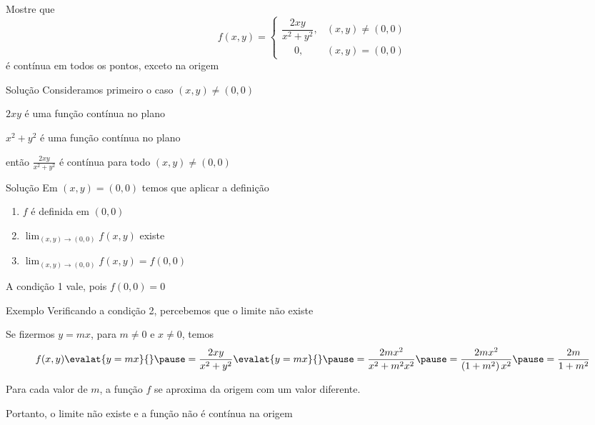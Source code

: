\documentclass[fleqn,utf8,aspectratio=169,12pt,ignorenonframetext]{beamer}
\begin{document}
\begin{question}
  Mostre que
  \[
    f(x, y) =
    \begin{cases}
      \dfrac{2xy}{x^2+y^2}, & (x, y) \neq (0, 0) \\
      \quad\; 0,            & (x, y) =    (0, 0)
    \end{cases}
  \]
  é contínua em todos os pontos, exceto na origem
\end{question}

\begin{resolution}{Solução}
  Consideramos primeiro o caso \((x, y) \neq (0, 0)\)

  \pause
  \vspace{\baselineskip}
  \(2xy\) é uma função contínua no plano

  \pause
  \(x^2+y^2\) é uma função contínua no plano

  \pause
  então \(\frac{2xy}{x^2+y^2}\)
  \pause
  é contínua para todo \((x, y) \neq (0, 0)\)
\end{resolution}

\begin{resolution}{Solução}
  Em \((x, y) = (0, 0)\) temos que aplicar a definição

  \pause
  \vspace{0.5\baselineskip}
  \begin{enumerate}
    \setlength\itemsep{1.5em}
    \item \(f\) é definida em \((0, 0)\)
    \item \(\lim_{(x, y)\to(0, 0)} f(x, y)\) existe
    \item \(\lim_{(x, y)\to(0, 0)} f(x, y) = f(0, 0)\)
  \end{enumerate}

  \pause
  \vspace{\baselineskip}
  A condição 1 vale, pois \(f(0, 0) = 0\)
\end{resolution}

\begin{frame}{Exemplo \theexemplo}
  Verificando a condição 2, percebemos que o limite não existe

  \pause
  Se fizermos \(y=mx\),
  \pause
  para \(m\neq 0\) e \(x\neq 0\), temos
  \pause
  \[
    f(x, y)\evalat{y=mx}{}
    \pause
    = \frac{2xy}{x^2+y^2}\evalat{y=mx}{}
    \pause
    = \frac{2mx^2}{x^2+m^2x^2}
    \pause
    = \frac{2mx^2}{\left(1+m^2\right)x^2}
    \pause
    = \frac{2m}{1+m^2}
  \]

  \pause
  Para cada valor de $m$, a função $f$ se aproxima da origem com um valor diferente.

  \pause
  Portanto, o limite não existe e a função não é contínua na origem
\end{frame}
\end{document}

